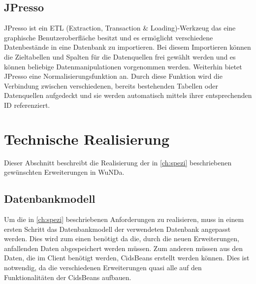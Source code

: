 \subsection{JPresso}
JPresso ist ein ETL (Extraction, Transaction \& Loading)-Werkzeug das eine graphische Benutzeroberfläche besitzt und es ermöglicht verschiedene Datenbestände in eine Datenbank zu importieren.
Bei diesem Importieren können die Zieltabellen und Spalten für die Datenquellen frei gewählt werden und es können beliebige Datenmanipulationen vorgenommen werden.
Weiterhin bietet JPresso eine Normalisierungsfunktion an.
Durch diese Funktion wird die Verbindung zwischen verschiedenen, bereits bestehenden Tabellen oder Datenquellen aufgedeckt und sie werden automatisch mittels ihrer entsprechenden ID referenziert. \autocite[vgl.][]{cismet-jpresso}



\section{Technische Realisierung}
Dieser Abschnitt beschreibt die Realisierung der in \autoref{ch:spezi} beschriebenen gewünschten Erweiterungen in \ac{WuNDa}.

\subsection{Datenbankmodell}
Um die in \autoref{ch:spezi} beschriebenen Anforderungen zu realisieren, muss in einem ersten Schritt das Datenbankmodell der verwendeten Datenbank angepasst werden.
Dies wird zum einen benötigt da die, durch die neuen Erweiterungen, anfallenden Daten abgespeichert werden müssen. Zum anderen müssen aus den Daten, die im Client benötigt werden, CidsBeans erstellt werden können. Dies ist notwendig, da die verschiedenen Erweiterungen quasi alle auf den Funktionalitäten der CidsBeans aufbauen.

